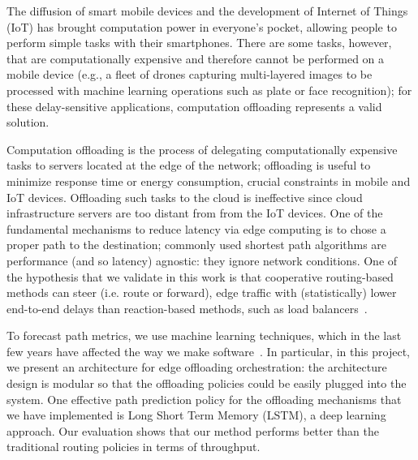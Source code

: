 \begin{summary}
The diffusion of smart mobile devices and the development of Internet of Things (IoT) has brought computation power in everyone's pocket, allowing people to perform simple tasks with their smartphones. There are some tasks, however, that are computationally  expensive and therefore cannot be performed on a mobile device (e.g., a fleet of drones capturing multi-layered images to be processed with machine learning operations such as plate or face recognition); for these delay-sensitive applications, computation offloading represents a valid solution.

Computation offloading is the process of delegating computationally expensive tasks to servers located at the edge of the network; offloading is useful to minimize response time or energy consumption, crucial constraints in mobile and IoT devices. Offloading such tasks to the cloud is ineffective since cloud infrastructure servers are too distant from from the IoT devices. %
One of the fundamental mechanisms to reduce latency via edge computing is to chose a proper path to the destination; commonly used shortest path algorithms are performance (and so latency) agnostic: they ignore network conditions. One of the hypothesis that we validate in this work is that cooperative routing-based methods can steer (i.e. route or forward), edge traffic with (statistically) lower end-to-end delays than reaction-based methods, such as load balancers~\cite{facebook_LB}.

To forecast path metrics, we use machine learning techniques, which in the last few years have affected the way we make software~\cite{karpathy}. 
In particular, in this project, we present an architecture for edge offloading orchestration: the architecture design is modular  so that the offloading policies could be easily plugged into the system. One effective path prediction policy for the offloading mechanisms that we have implemented is Long Short Term Memory (LSTM), a deep learning approach. Our evaluation shows that our method performs better than the traditional routing policies in terms of throughput.

\end{summary}